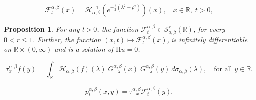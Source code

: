 \documentclass[10pt,a4paper]{amsart}
\newtheorem{proposition}{Proposition}
\def \H{{\mathcal H}}
\def \R{{\mathbb R}}
\def \S{{\mathcal S}}
\begin{document}
\begin{equation}\label{eq08}
\mathcal{F}_t^{\alpha, \beta}(x)= \H_{\alpha, \beta}^{-1}  \left(  e^{-\frac{t}{2}\left( \lambda^2 + \rho^2 \right)}  \right)(x), \quad x \in \R, \; t>0,
\end{equation}

\begin{proposition}\label{pro2}
For any $t>0$, the function $\mathcal{F}_t^{\alpha, \beta} \in \S^r_{\alpha, \beta} (\mathbb{R})$, for every $0< r \leq 1$. Further, the function $(x, t) \mapsto \mathcal{F}_t^{\alpha, \beta} (x)$, is infinitely differentiable on $ \mathbb{R} \times (0, \infty)$ and is a solution of $\mathrm{H} u = 0$.
\end{proposition} 

\begin{equation}\label{eq09}
\tau^{\alpha, \beta}_x f(y) = \int_{\mathbb{R}} \H_{\alpha, \beta} (f) (\lambda) \; G^{\alpha, \beta}_{-\lambda}(x) \; G^{\alpha, \beta}_{-\lambda}(y) \;  d\sigma_{\alpha, \beta}(\lambda), \quad \text{for all } y \in \R.
\end{equation}

\begin{equation}\label{eq1}
p_t^{\alpha, \beta}(x, y) =  \tau^{\alpha, \beta}_{-x} \mathcal{F}_t^{\alpha, \beta}(y).
\end{equation}
\end{document}
